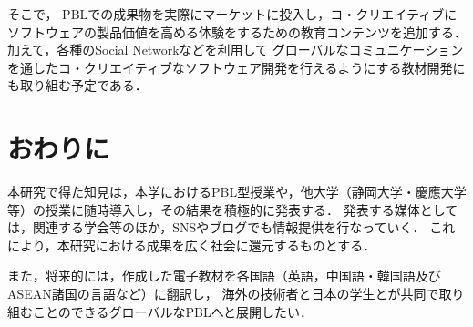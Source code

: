 \documentclass[a4j,9pt,twocolumn,twoside]{jsarticle}
\begin{document}
	そこで，
	PBLでの成果物を実際にマーケットに投入し，コ・クリエイティブにソフトウェアの製品価値を高める体験をするための教育コンテンツを追加する．
	加えて，各種のSocial Networkなどを利用して
	グローバルなコミュニケーションを通したコ・クリエイティブなソフトウェア開発を行えるようにする教材開発にも取り組む予定である．

\section{おわりに}\label{sec:fin}
	本研究で得た知見は，本学におけるPBL型授業や，他大学（静岡大学・慶應大学等）の授業に随時導入し，その結果を積極的に発表する．
	発表する媒体としては，関連する学会等のほか，SNSやブログでも情報提供を行なっていく．
	これにより，本研究における成果を広く社会に還元するものとする．
	
	また，将来的には，作成した電子教材を各国語（英語，中国語・韓国語及びASEAN諸国の言語など）に翻訳し，
	海外の技術者と日本の学生とが共同で取り組むことのできるグローバルなPBLへと展開したい．
	
\end{document}
